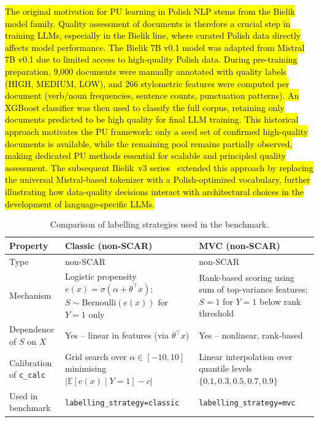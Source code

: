\documentclass[applsci,article,submit,pdftex,moreauthors]{Definitions/mdpi}
\newcommand{\rev}[1]{\hl{#1}}
\begin{document}
\rev{The original motivation for PU learning in Polish NLP stems from the Bielik model family. Quality assessment of documents is therefore a crucial step in training LLMs, especially in the Bielik line, where curated Polish data directly affects model performance. The Bielik 7B v0.1 model was adapted from Mistral 7B v0.1 due to limited access to high-quality Polish data. During pre-training preparation, 9,000 documents were manually annotated with quality labels (HIGH, MEDIUM, LOW), and 266 stylometric features were computed per document (verb/noun frequencies, sentence counts, punctuation patterns). An XGBoost classifier was then used to classify the full corpus, retaining only documents predicted to be high quality for final LLM training. This historical approach motivates the PU framework: only a seed set of confirmed high-quality documents is available, while the remaining pool remains partially observed, making dedicated PU methods essential for scalable and principled quality assessment. The subsequent Bielik~v3 series~\cite{ociepa2026bielikv3tok} extended this approach by replacing the universal Mistral-based tokenizer with a Polish-optimized vocabulary, further illustrating how data-quality decisions interact with architectural choices in the development of language-specific LLMs.}

\begin{table}[t]
\centering
\caption{Comparison of labelling strategies used in the benchmark.}
\label{tab:labelling_strategies}
\small
\begin{tabularx}{\textwidth}{l >{\raggedright\arraybackslash}X >{\raggedright\arraybackslash}X}
\toprule
\textbf{Property} & \textbf{Classic (non-SCAR)} & \textbf{MVC (non-SCAR)} \\
\midrule
Type & non-SCAR & non-SCAR \\
\addlinespace
Mechanism & Logistic propensity $e(x) = \sigma(\alpha + \theta^\top x)$; $S \sim \mathrm{Bernoulli}(e(x))$ for $Y=1$ only & Rank-based scoring using sum of top-variance features; $S=1$ for $Y=1$ below rank threshold \\
\addlinespace
Dependence of $S$ on $X$ & Yes -- linear in features (via $\theta^\top x$) & Yes -- nonlinear, rank-based \\
\addlinespace
Calibration of \texttt{c\_calc} & Grid search over $\alpha \in [-10, 10]$ minimising $\bigl|\mathbb{E}[e(x) \mid Y=1] - c\bigr|$ & Linear interpolation over quantile levels $\{0.1, 0.3, 0.5, 0.7, 0.9\}$ \\
\addlinespace
Used in benchmark & \texttt{labelling\_strategy=classic} & \texttt{labelling\_strategy=mvc} \\
\bottomrule
\end{tabularx}
\end{table}
\end{document}

